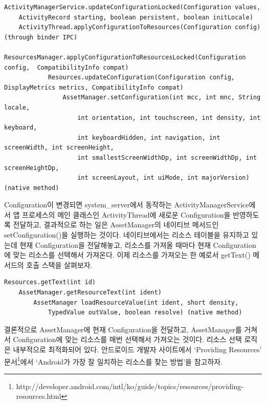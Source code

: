 \begin{lstlisting}[frame=single]
ActivityManagerService.updateConfigurationLocked(Configuration values,
	ActivityRecord starting, boolean persistent, boolean initLocale)
	ActivityThread.applyConfigurationToResources(Configuration config) (through binder IPC)
		ResourcesManager.applyConfigurationToResourcesLocked(Configuration config, 	CompatibilityInfo compat)
			Resources.updateConfiguration(Configuration config, DisplayMetrics metrics, CompatibilityInfo compat)
				AssetManager.setConfiguration(int mcc, int mnc, String locale,
            		int orientation, int touchscreen, int density, int keyboard,
            		int keyboardHidden, int navigation, int screenWidth, int screenHeight,
            		int smallestScreenWidthDp, int screenWidthDp, int screenHeightDp,
            		int screenLayout, int uiMode, int majorVersion) (native method)
\end{lstlisting}
\lstset{basicstyle=\ttfamily\footnotesize}
Configuration이 변경되면 system\_server에서 동작하는 ActivityManagerService에서 앱 프로세스의 메인 클래스인 ActivityThread에 새로운 Configuration을 반영하도록 전달하고, 결과적으로 하는 일은 AssetManager의 네이티브 메서드인 setConfiguration()을 실행하는 것이다. 
네이티브에서는 리소스 테이블을 유지하고 있는데 현재 Configuration을 전달해놓고, 리소스를 가져올 때마다 현재 Configuration에 맞는 리소스를 선택해서 가져온다.
이제 리소스를 가져오는 한 예로서 getText() 메서드의 호출 스택을 살펴보자.
\begin{lstlisting}[frame=single]
Resources.getText(int id)
	AssetManager.getResourceText(int ident)
		AssetManager loadResourceValue(int ident, short density,
			TypedValue outValue, boolean resolve) (native method)
\end{lstlisting}
결론적으로 AssetManager에 현재 Configuration을 전달하고, AssetManager를 거쳐서 Configuration에 맞는 리소스를 매번 선택해서 가져오는 것이다. 
리소스 선택 로직은 내부적으로 최적화되어 있다. 안드로이드 개발자 사이트에서 `Providing Resources' 문서\footnote{http://developer.android.com/intl/ko/guide/topics/resources/providing-resources.html}에서 `Android가 가장 잘 일치하는 리소스를 찾는 방법'을 참고하자.

